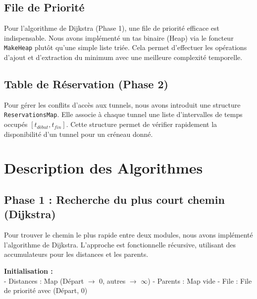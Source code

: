 \documentclass[a4paper,11pt]{article}
\begin{document}
\subsection{File de Priorité}
Pour l'algorithme de Dijkstra (Phase 1), une file de priorité efficace est indispensable. Nous avons implémenté un tas binaire (Heap) via le foncteur \texttt{MakeHeap} plutôt qu'une simple liste triée. Cela permet d'effectuer les opérations d'ajout et d'extraction du minimum avec une meilleure complexité temporelle.

\subsection{Table de Réservation (Phase 2)}
Pour gérer les conflits d'accès aux tunnels, nous avons introduit une structure \texttt{ReservationsMap}. Elle associe à chaque tunnel une liste d'intervalles de temps occupés $[t_{début}, t_{fin}]$. Cette structure permet de vérifier rapidement la disponibilité d'un tunnel pour un créneau donné.

\section{Description des Algorithmes}

\subsection{Phase 1 : Recherche du plus court chemin (Dijkstra)}
Pour trouver le chemin le plus rapide entre deux modules, nous avons implémenté l'algorithme de Dijkstra. L'approche est fonctionnelle récursive, utilisant des accumulateurs pour les distances et les parents.

\begin{algorithm}[H]
\SetAlgoLined
{}
 \textbf{Initialisation :}\\
 - Distances : Map (Départ $\rightarrow$ 0, autres $\rightarrow$ $\infty$)\;
 - Parents : Map vide\;
 - File : File de priorité avec (Départ, 0)\;
 
 \caption{Algorithme de Dijkstra (Phase 1)}
\end{algorithm}
\end{document}
